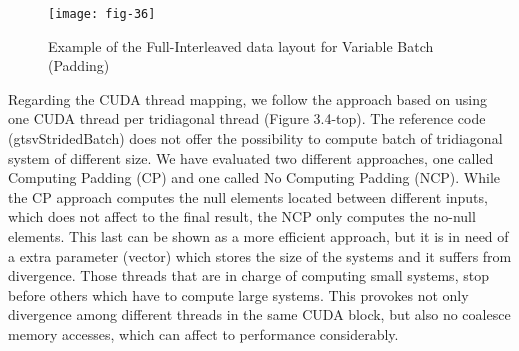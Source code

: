     \vspace{1ex}
    \begin{figure}[htbp]
        \centering
        \texttt{[image: fig-36]}
        \caption{Example of the Full-Interleaved data layout for Variable Batch (Padding)}
        \label{fig:fig-36}
    \end{figure}

    Regarding the CUDA thread mapping, we follow the approach based on using one
    CUDA thread per tridiagonal thread (Figure 3.4-top). The reference code (gtsvStridedBatch) does not offer the possibility to compute batch of tridiagonal system of different
    size. We have evaluated two different approaches, one called Computing Padding (CP)
    and one called No Computing Padding (NCP). While the CP approach computes the
    null elements located between different inputs, which does not affect to the final result,
    the NCP only computes the no-null elements. This last can be shown as a more efficient
    approach, but it is in need of a extra parameter (vector) which stores the size of the
    systems and it suffers from divergence. Those threads that are in charge of computing
    small systems, stop before others which have to compute large systems. This provokes
    not only divergence among different threads in the same CUDA block, 
    but also no coalesce memory accesses, which can affect to performance
    considerably. 




